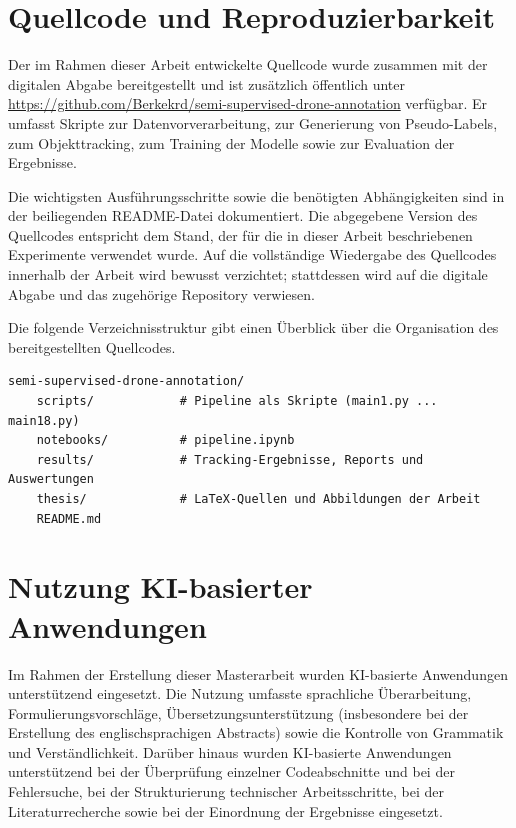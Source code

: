 \section{Quellcode und Reproduzierbarkeit}
\label{app:quellcode}

Der im Rahmen dieser Arbeit entwickelte Quellcode wurde zusammen mit der
digitalen Abgabe bereitgestellt und ist zusätzlich öffentlich unter
\url{https://github.com/Berkekrd/semi-supervised-drone-annotation} verfügbar.
Er umfasst Skripte zur Datenvorverarbeitung, zur Generierung von Pseudo-Labels,
zum Objekttracking, zum Training der Modelle sowie zur Evaluation der Ergebnisse.

Die wichtigsten Ausführungsschritte sowie die benötigten Abhängigkeiten sind in
der beiliegenden README-Datei dokumentiert. Die abgegebene Version des
Quellcodes entspricht dem Stand, der für die in dieser Arbeit beschriebenen
Experimente verwendet wurde. Auf die vollständige Wiedergabe des Quellcodes
innerhalb der Arbeit wird bewusst verzichtet; stattdessen wird auf die digitale
Abgabe und das zugehörige Repository verwiesen.

Die folgende Verzeichnisstruktur gibt einen Überblick über die Organisation des
bereitgestellten Quellcodes.

\begin{verbatim}
semi-supervised-drone-annotation/
    scripts/            # Pipeline als Skripte (main1.py ... main18.py)
    notebooks/          # pipeline.ipynb
    results/            # Tracking-Ergebnisse, Reports und Auswertungen
    thesis/             # LaTeX-Quellen und Abbildungen der Arbeit
    README.md
\end{verbatim}


\section*{Nutzung KI-basierter Anwendungen}

Im Rahmen der Erstellung dieser Masterarbeit wurden KI-basierte Anwendungen
unterstützend eingesetzt. Die Nutzung umfasste sprachliche Überarbeitung,
Formulierungsvorschläge, Übersetzungsunterstützung (insbesondere bei der
Erstellung des englischsprachigen Abstracts) sowie die Kontrolle von Grammatik
und Verständlichkeit. Darüber hinaus wurden KI-basierte Anwendungen
unterstützend bei der Überprüfung einzelner Codeabschnitte und bei der
Fehlersuche, bei der Strukturierung technischer Arbeitsschritte, bei der
Literaturrecherche sowie bei der Einordnung der Ergebnisse eingesetzt.

